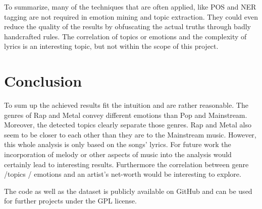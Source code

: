 \documentclass[10pt,a4paper]{article}
\begin{document}
	To summarize, many of the techniques that are often applied, like POS and NER tagging are not required in emotion mining and topic extraction. They could even reduce the quality of the results by obfuscating the actual truths through badly handcrafted rules. The correlation of topics or emotions and the complexity of lyrics is an interesting topic, but not within the scope of this project. 

	\section{Conclusion}
	\label{sec:conclusion}
	To sum up the achieved results fit the intuition and are rather reasonable. The genres of Rap and Metal convey different emotions than Pop and Mainstream. Moreover, the detected topics clearly separate those genres. Rap and Metal also seem to be closer to each other than they are to the Mainstream music. However, this whole analysis is only based on the songs' lyrics. For future work the incorporation of melody or other aspects of music into the analysis would certainly lead to interesting results. Furthermore the correlation between genre /topics /  emotions and an artist's net-worth would be interesting to explore.
	
	The code as well as the dataset is publicly available on GitHub \cite{code} and can be used for further projects under the GPL license.
	
	\newpage
	
	
	
	
\end{document}

